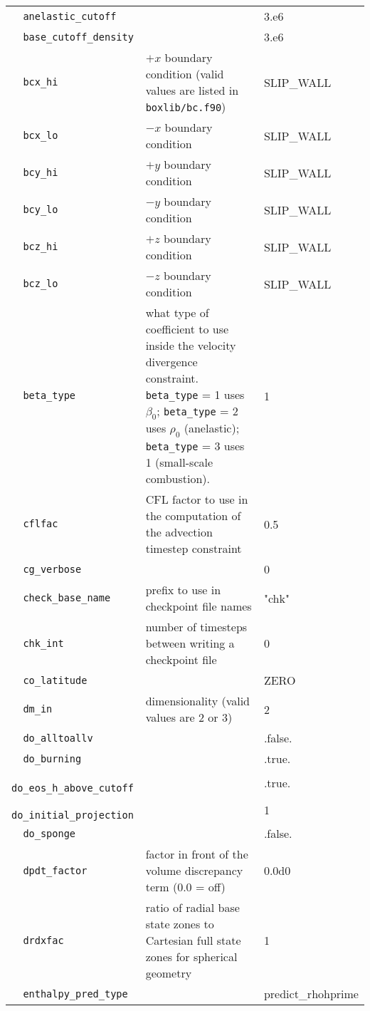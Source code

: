 {\begin{center}
\begin{longtable}{|l|p{3.25in}|l|}
\verb=  anelastic_cutoff =  &   &  3.e6 \\
\verb=  base_cutoff_density =  &   &  3.e6 \\
\verb=  bcx_hi =  & $+x$ boundary condition (valid values are listed in {\tt  boxlib/bc.f90})  &  SLIP\_WALL \\
\verb=  bcx_lo =  & $-x$ boundary condition  &  SLIP\_WALL \\
\verb=  bcy_hi =  & $+y$ boundary condition  &  SLIP\_WALL \\
\verb=  bcy_lo =  & $-y$ boundary condition  &  SLIP\_WALL \\
\verb=  bcz_hi =  & $+z$ boundary condition  &  SLIP\_WALL \\
\verb=  bcz_lo =  & $-z$ boundary condition  &  SLIP\_WALL \\
\verb=  beta_type =  & what type of coefficient to use inside the velocity divergence constraint.  
                       {\tt beta\_type} = 1 uses $\beta_0$; {\tt beta\_type} = 2 uses $\rho_0$ (anelastic);
                       {\tt beta\_type} = 3 uses 1 (small-scale combustion).  &  1 \\
\verb=  cflfac =  & CFL factor to use in the computation of the advection timestep constraint  &  0.5 \\
\verb=  cg_verbose =  &   &  0 \\
\verb=  check_base_name =  & prefix to use in checkpoint file names  &  "chk" \\
\verb=  chk_int =  & number of timesteps between writing a checkpoint file  & 0 \\
\verb=  co_latitude =  &   &  ZERO \\
\verb=  dm_in =  & dimensionality (valid values are 2 or 3)  &  2 \\
\verb=  do_alltoallv =  &   &  .false. \\
\verb=  do_burning =  &   &  .true. \\
\verb=  do_eos_h_above_cutoff =  &   &  .true. \\
\verb=  do_initial_projection =  &   & 1 \\
\verb=  do_sponge =  &   &  .false. \\
\verb=  dpdt_factor =  & factor in front of the volume discrepancy term (0.0 = off)  &  0.0d0 \\
\verb=  drdxfac =  & ratio of radial base state zones to Cartesian full state zones for spherical geometry  &  1 \\
\verb=  enthalpy_pred_type =  &   &  predict\_rhohprime \\

\end{longtable}
\end{center}}
